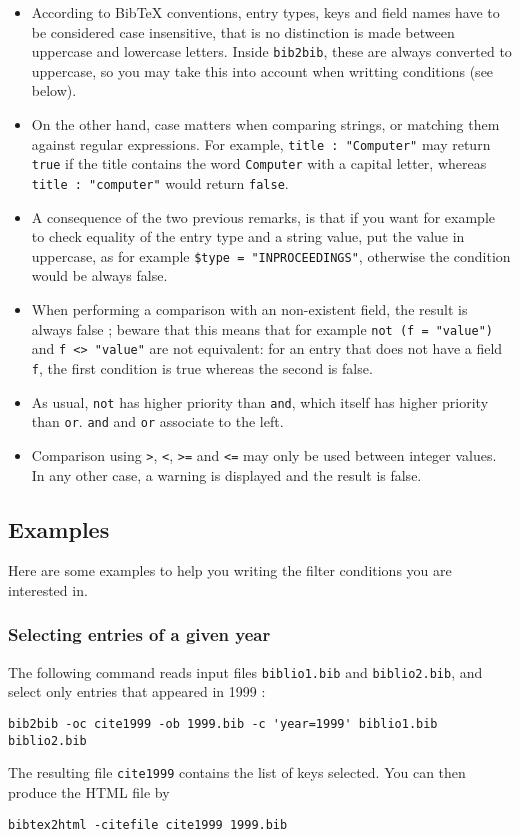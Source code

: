 \documentclass[11pt,a4paper]{article}
\begin{document}
\begin{itemize}
\item According to BibTeX conventions, entry types, keys and field
  names have to be considered case insensitive, that is no distinction
  is made between uppercase and lowercase letters. Inside
  \verb|bib2bib|, these are always converted to uppercase, so you may
  take this into account when writting conditions (see below).
\item On the other hand, case matters when comparing strings, or
  matching them against regular expressions. For example, 
  \verb|title : "Computer"| may return \verb|true| if the title
  contains the word \verb|Computer| with a capital letter, whereas
  \verb|title : "computer"| would return \verb|false|.
\item A consequence of the two previous remarks, is that if you want for
  example to check equality of the entry type and a string value, put the
  value in uppercase, as for example \verb|$type = "INPROCEEDINGS"|,
  otherwise the condition would be always false. 
\item When performing a comparison with an non-existent field, the result is
  always false ; beware that this means that for example 
  \verb|not (f = "value")| and \verb|f <> "value"| are not equivalent: for an
  entry that does not have a field \verb|f|, the first condition is true
  whereas the second is false. 
\item As usual, \verb|not| has higher priority than \verb|and|, which itself
  has higher priority than \verb|or|. \verb|and| and \verb|or| associate to
  the left.
\item Comparison using \verb|>|, \verb|<|, \verb|>=| and \verb|<=| may only be
  used between integer values. In any other case, a warning is displayed and
  the result is false.
\end{itemize}

\subsection{Examples}

Here are some examples to help you writing the filter conditions you
are interested in.

\subsubsection{Selecting entries of a given year}

The following command reads input files \verb|biblio1.bib| and
\verb|biblio2.bib|, and select only entries that appeared in 1999 :
\begin{verbatim}
bib2bib -oc cite1999 -ob 1999.bib -c 'year=1999' biblio1.bib biblio2.bib 
\end{verbatim}
The resulting file \verb|cite1999| contains the list of keys
selected. You can then produce the HTML file by
\begin{verbatim}
bibtex2html -citefile cite1999 1999.bib
\end{verbatim}
\end{document}
